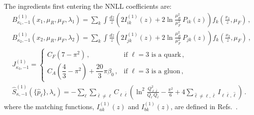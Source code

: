 The ingredients first entering the NNLL coefficients are:
\begin{subequations}
\label{eq:Cd1-ingred}
\begin{align}
&B_{\kappa_{1},-1}^{(1)}(x_1,\mu_R,\mu_F,\lambda_1) = \sum_{k}\int\frac{dz}{z} \left( 2I_{ik}^{(1)}(z)+2\ln\frac{\mu_R^2}{\mu_F^2}\,P_{ik}(z)\right)f_k\left(\frac{x_1}{z},\mu_F\right)\,, \\[1ex]
&B_{\kappa_{2},-1}^{(1)}(x_2,\mu_R,\mu_F,\lambda_2) = \sum_{k}\int\frac{dz}{z} \left( 2I_{jk}^{(1)}(z)+2\ln\frac{\mu_R^2}{\mu_F^2}\,P_{jk}(z)\right)f_k\left(\frac{x_2}{z},\mu_F\right)\,, \\[1ex]
&J_{\kappa_3,-1}^{(1)} = \begin{cases}
    C_F(7-\pi^2)\,, & \text{if $\ell=3$ is a quark}\,, \\[4pt]
    C_A\!\left(\dfrac{4}{3}-\pi^2\right)+\dfrac{20}{3}\pi\beta_0\,, &\text{if $\ell=3$ is a gluon}\,,
\end{cases} \\[1ex]
&\widehat{S}_{\kappa,-1}^{(1)}\left(\{\hat{p}_{\ell}\},\lambda_s\right)
  = -\sum_{\ell}\sum_{\bar{\ell}\neq\ell}C_{\ell\bar\ell}\left(\ln^2\frac{Q_{\ell\bar{\ell}}^2}{Q_{\ell}\,Q_{\bar{\ell}}}-\frac{\pi^2}{6}+4\sum_{\hat{\ell}\neq\ell,\bar{\ell}}I_{\ell\bar{\ell},\hat{\ell}}\right)\,.
\end{align}
\end{subequations}
where the matching functions, $I_{ak}^{(1)}(z)$ and $I_{bk}^{(1)}(z)$, 
are defined in Refs.~\cite{Gaunt:2014xga,Gaunt:2014cfa}.

